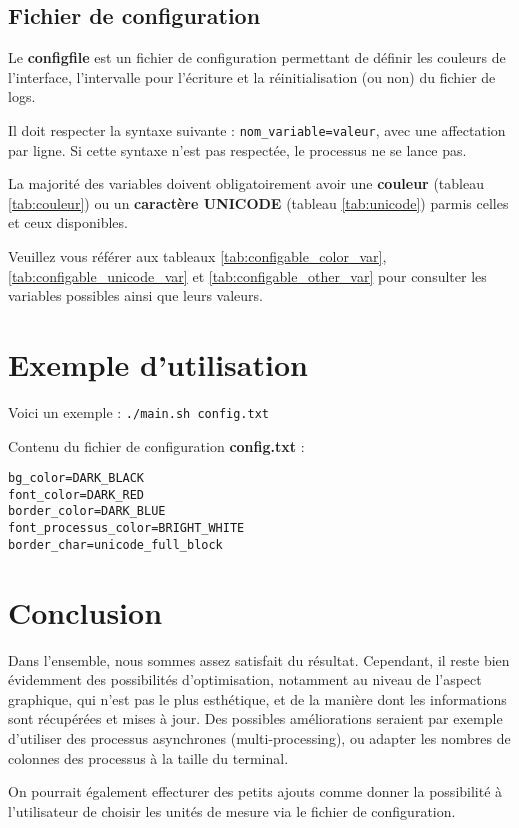 \documentclass{article}
\begin{document}
\subsection{Fichier de configuration}
Le \textbf{configfile} est un fichier de configuration permettant de définir les couleurs de l'interface, l'intervalle pour l'écriture et la réinitialisation (ou non) du fichier de logs.
  
Il doit respecter la syntaxe suivante : \texttt{nom\_variable=valeur}, avec une affectation par ligne. Si cette syntaxe n'est pas respectée, le processus ne se lance pas.
\vspace{1em}

La majorité des variables doivent obligatoirement avoir une \textbf{couleur} (tableau \ref{tab:couleur}) ou un \textbf{caractère UNICODE} (tableau \ref{tab:unicode}) parmis celles et ceux disponibles.
  
Veuillez vous référer aux tableaux \ref{tab:configable_color_var}, \ref{tab:configable_unicode_var} et \ref{tab:configable_other_var} pour consulter les variables possibles ainsi que leurs valeurs.

\section{Exemple d'utilisation}
Voici un exemple : \texttt{./main.sh config.txt}
  
\vspace{0.5em}
Contenu du fichier de configuration \textbf{config.txt} :
\begin{verbatim}
bg_color=DARK_BLACK
font_color=DARK_RED
border_color=DARK_BLUE
font_processus_color=BRIGHT_WHITE
border_char=unicode_full_block
\end{verbatim}


\section{Conclusion}
Dans l'ensemble, nous sommes assez satisfait du résultat. Cependant, il reste bien évidemment des possibilités d'optimisation, notamment au niveau de l'aspect graphique, qui n'est pas le plus esthétique,
et de la manière dont les informations sont récupérées et mises à jour. 
Des possibles améliorations seraient par exemple d'utiliser des processus asynchrones (multi-processing), ou adapter les nombres de colonnes des processus à la taille du terminal.
  
On pourrait également effecturer des petits ajouts comme donner la possibilité à l'utilisateur de choisir les unités de mesure via le fichier de configuration.
\end{document}
